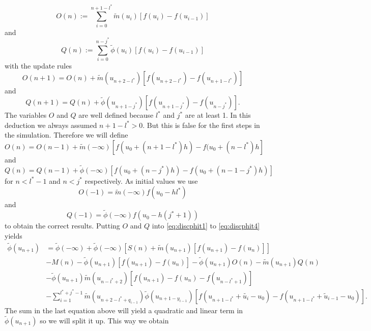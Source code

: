 \documentclass[12pt,a4paper,twoside, open=right]{scrreprt}
\theoremstyle{definition}
\theoremstyle{plain}
\begin{document}
\begin{equation}
    O(n):=\sum_{i=0}^{n+1-l^*}\tilde{m}(u_i)[f(u_i)-f(u_{i-1})]
\end{equation}
and 
\begin{equation}
    Q(n):=\sum_{i=0}^{n-j^*}\tilde\phi(u_{i})[f(u_i)-f(u_{i-1})]
\end{equation}
with the update rules
\begin{equation}
O(n+1) = O(n)+\tilde{m}(u_{n+2-l^*})[f(u_{n+2-l^*})-f(u_{n+1-l^*})]
\end{equation}
and 
\begin{equation}
Q(n+1) = Q(n) + \tilde\phi(u_{n+1-j^*})[f(u_{n+1-j^*})-f(u_{n-j^*})].
\end{equation}
The variables $O$ and $Q$ are well defined because $l^*$ and $j^*$ are at least 1. In this deduction we always assumed $n+1-l^*>0$. But this is false for the first steps in the simulation. Therefore we will define
\begin{equation}
    O(n)= O(n-1)+\tilde{m}(-\infty)[f(u_0+(n+1-l^*)h)-f(u_0+(n-l^*)h]
\end{equation}
and 
\begin{equation}
Q(n)= Q(n-1)+\tilde{\phi}(-\infty)[f(u_0+(n-j^*)h)-f(u_0+(n-1-j^*)h)]
\end{equation}
for $n<l^*-1$ and $n<j^*$ respectively. As initial values we use 
\begin{equation}
    O(-1) = \tilde{m}(-\infty)f(u_0-hl^*)
\end{equation}
and
\begin{equation}
    Q(-1) = \tilde{\phi}(-\infty)f(u_0-h(j^*+1))
\end{equation}
to obtain the correct results.
Putting $O$ and $Q$ into \eqref{eq:discphit1} to \eqref{eq:discphit4} yields
\begin{align}
    \tilde\phi(u_{n+1})&=\tilde\phi(-\infty) +\tilde\phi(-\infty)[S(n)+\tilde{m}(u_{n+1})[f(u_{n+1})-f(u_n)]]\\&-M(n) -\tilde\phi(u_{n+1})[f(u_{n+1})-f(u_{n})] -\tilde{\phi}(u_{n+1})O(n)-\tilde{m}(u_{n+1})Q(n)\\&-\tilde\phi(u_{n+1})\tilde{m}(u_{n-l^*+2})[f(u_{n+1})-f(u_n)-f(u_{n-l^*+1})] \\&-\sum_{i=1}^{l^*+j^*-1}\tilde{m}(u_{n+2-l^*+q_{i-1}})\tilde{\phi}(u_{n+1-y_{i-1}})[f(u_{n+1-l^*}+\tilde{u_i}-u_0)-f(u_{n+1-l^*}+\tilde{u}_{i-1}-u_0)].
\end{align}
The sum in the last equation above will yield a quadratic and linear term in $\tilde{\phi}(u_{n+1})$ so we will split it up. This way we obtain
\end{document}

